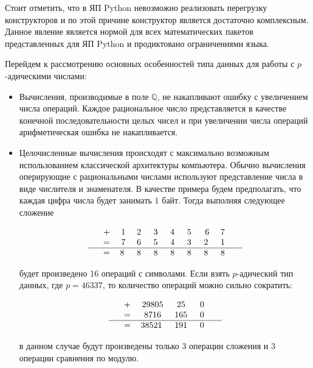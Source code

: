 \documentclass[master, och, diploma, times]{sty/SCWorks}
\theoremstyle{plain}
\theoremstyle{definition}
\numberwithin{equation}{section}
\begin{document}
Стоит отметить, что в ЯП Python невозможно реализовать перегрузку конструкторов и по этой причине конструктор является достаточно комплексным. Данное явление является нормой для всех математических пакетов представленных для ЯП Python и продиктовано ограничениями языка.  


Перейдем к рассмотрению основных особенностей типа данных для работы с $p$-адическими числами:

\begin{itemize}

\item Вычисления, производимые в поле $\mathbb{Q}$, не накапливают ошибку с увеличением числа операций. Каждое рациональное число представляется в качестве конечной последовательности целых чисел и при увеличении числа операций арифметическая ошибка не накапливается.

\item Целочисленные вычисления происходят с максимально возможным использованием классической архитектуры компьютера. Обычно вычисления оперирующие с рациональными числами используют представление числа в виде числителя и знаменателя. В качестве примера будем предполагать, что каждая цифра числа будет занимать $1$ байт. Тогда выполняя следующее сложение

$$
\begin{tabular}{ccccccccccc}
& + & 1 & 2\; & 3\; & 4\; & 5\; & 6 & 7\; &  \\
& = & 7 & 6\; & 5\; & 4\; & 3\; & 2\; & 1\; &  \\
\hline
& = & 8\; & 8\; & 8\; & 8\; & 8\; & 8\; & 8\; &
\end{tabular}
$$

будет произведено 16 операций с символами. Если взять $p$-адический тип данных, где $p=46337$, то количество операций можно сильно сократить:

$$
\begin{tabular}{ccccccccccc}
& + & 29805 & 25\; & 0\; &  \\
& = & 8716 & 165\; & 0\; & \\
\hline
& = & 38521\; & 191\; & 0\; &
\end{tabular}
$$

в данном случае будут произведены только $3$ операции сложения и $3$ операции сравнения по модулю.


\end{itemize}
\end{document}
